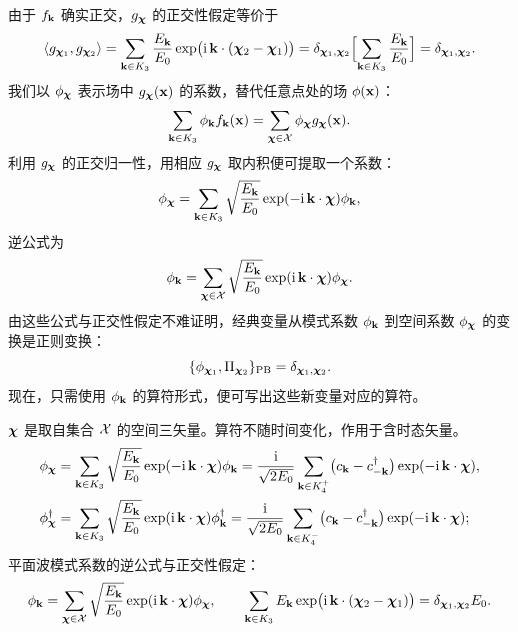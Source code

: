 由于 $f_{\mathbf{k}}$ 确实正交，$g_{\boldsymbol{\chi}}$ 的正交性假定等价于
\begin{equation*}
\langle g_{\boldsymbol{\chi}_{1}},g_{\boldsymbol{\chi}_{2}}\rangle
=\sum_{\mathbf{k}\in K_{3}}\frac{E_{\mathbf{k}}}{E_{0}}\exp\bigl(\mathrm{i}\,\mathbf{k}\cdot(\boldsymbol{\chi}_{2}-\boldsymbol{\chi}_{1})\bigr)
=\delta_{\boldsymbol{\chi}_{1},\boldsymbol{\chi}_{2}}\Bigl[\sum_{\mathbf{k}\in K_{3}}\frac{E_{\mathbf{k}}}{E_{0}}\Bigr]
=\delta_{\boldsymbol{\chi}_{1},\boldsymbol{\chi}_{2}} .
\end{equation*}
我们以 $\phi_{\boldsymbol{\chi}}$ 表示场中 $g_{\boldsymbol{\chi}}(\mathbf{x})$ 的系数，替代任意点处的场 $\phi(\mathbf{x})$：
\begin{equation*}
\sum_{\mathbf{k}\in K_{3}}\phi_{\mathbf{k}}f_{\mathbf{k}}(\mathbf{x})=\sum_{\boldsymbol{\chi}\in\mathcal{X}}\phi_{\boldsymbol{\chi}}g_{\boldsymbol{\chi}}(\mathbf{x}).
\end{equation*}
利用 $g_{\boldsymbol{\chi}}$ 的正交归一性，用相应 $g_{\boldsymbol{\chi}}$ 取内积便可提取一个系数：
\begin{equation*}
\phi_{\boldsymbol{\chi}}=\sum_{\mathbf{k}\in K_{3}}\sqrt{\frac{E_{\mathbf{k}}}{E_{0}}}\exp(-\mathrm{i}\,\mathbf{k}\cdot\boldsymbol{\chi})\phi_{\mathbf{k}},
\end{equation*}
逆公式为
\begin{equation*}
\phi_{\mathbf{k}}=\sum_{\boldsymbol{\chi}\in\mathcal{X}}\sqrt{\frac{E_{\mathbf{k}}}{E_{0}}}\exp(\mathrm{i}\,\mathbf{k}\cdot\boldsymbol{\chi})\phi_{\boldsymbol{\chi}}.
\end{equation*}
由这些公式与正交性假定不难证明，经典变量从模式系数 $\phi_{\mathbf{k}}$ 到空间系数 $\phi_{\boldsymbol{\chi}}$ 的变换是正则变换：
\begin{equation*}
\{\phi_{\boldsymbol{\chi}_{1}},\Pi_{\boldsymbol{\chi}_{2}}\}_{\text{PB}}=\delta_{\boldsymbol{\chi}_{1},\boldsymbol{\chi}_{2}} .
\end{equation*}
现在，只需使用 $\phi_{\mathbf{k}}$ 的算符形式，便可写出这些新变量对应的算符。

\begin{keybox}
$\boldsymbol{\chi}$ 是取自集合 $\mathcal{X}$ 的空间三矢量。算符不随时间变化，作用于含时态矢量。
\begin{align*}
\phi_{\boldsymbol{\chi}}&=\sum_{\mathbf{k}\in K_{3}}\sqrt{\frac{E_{\mathbf{k}}}{E_{0}}}\exp(-\mathrm{i}\,\mathbf{k}\cdot\boldsymbol{\chi})\phi_{\mathbf{k}}
=\frac{\mathrm{i}}{\sqrt{2E_{0}}}\sum_{\mathbf{k}\in K_{4}^{+}}\bigl(c_{\mathbf{k}}-c^{\dagger}_{-\mathbf{k}}\bigr)
\exp(-\mathrm{i}\,\mathbf{k}\cdot\boldsymbol{\chi}),\\
\phi^{\dagger}_{\boldsymbol{\chi}}&=\sum_{\mathbf{k}\in K_{3}}\sqrt{\frac{E_{\mathbf{k}}}{E_{0}}}\exp(\mathrm{i}\,\mathbf{k}\cdot\boldsymbol{\chi})\phi^{\dagger}_{\mathbf{k}}
=\frac{\mathrm{i}}{\sqrt{2E_{0}}}\sum_{\mathbf{k}\in K_{4}^{-}}\bigl(c_{\mathbf{k}}-c^{\dagger}_{-\mathbf{k}}\bigr)
\exp(-\mathrm{i}\,\mathbf{k}\cdot\boldsymbol{\chi});
\end{align*}
平面波模式系数的逆公式与正交性假定：
\begin{equation*}
\phi_{\mathbf{k}}=\sum_{\boldsymbol{\chi}\in\mathcal{X}}\sqrt{\frac{E_{\mathbf{k}}}{E_{0}}}\exp(\mathrm{i}\,\mathbf{k}\cdot\boldsymbol{\chi})\phi_{\boldsymbol{\chi}},
\qquad
\sum_{\mathbf{k}\in K_{3}}E_{\mathbf{k}}\exp\bigl(\mathrm{i}\,\mathbf{k}\cdot(\boldsymbol{\chi}_{2}-\boldsymbol{\chi}_{1})\bigr)
=\delta_{\boldsymbol{\chi}_{1},\boldsymbol{\chi}_{2}}E_{0}.
\end{equation*}
\end{keybox}


